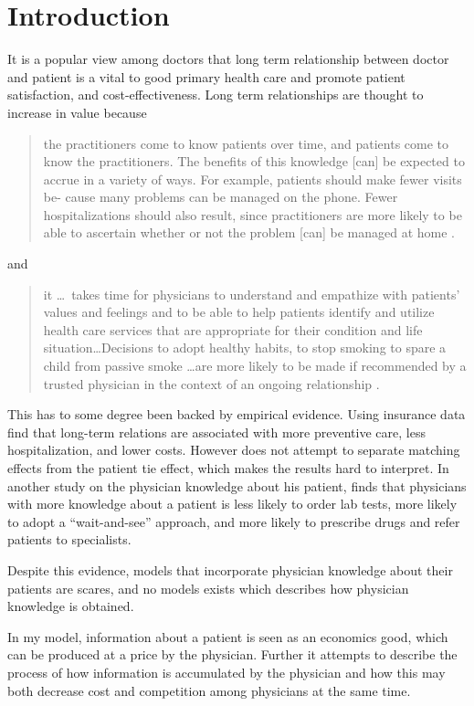 \documentclass[11pt,a4paper,twoside]{article}
\begin{document}
\section{Introduction}
It is a popular view among doctors that long term relationship between doctor and patient is a vital to good primary health care and promote patient satisfaction, and cost-effectiveness. Long term relationships are thought to increase in value because
\begin{quotation}
the practitioners come to know patients over time, and patients come to know the practitioners. The benefits of this knowledge [can] be expected to accrue in a variety of ways. For example, patients should make fewer visits be- cause many problems can be managed on the phone. Fewer hospitalizations should also result, since practitioners are more likely to be able to ascertain whether or not the problem [can] be managed at home \parencite[p. 41--42]{Starfield1992}.
\end{quotation}
and
\begin{quotation}
it \ldots \ takes time for physicians to understand and empathize with patients' values and feelings and to be able to help patients identify and utilize health care services that are appropriate for their condition and life situation\ldots Decisions to adopt healthy habits, to stop smoking to spare a child from passive smoke \ldots are more likely to be made if recommended by a trusted physician in the context of an ongoing relationship \parencite[p. 324--235]{Emanuel1995}.
\end{quotation}
This has to some degree been backed by empirical evidence. Using insurance data \textcite{Weiss1996} find that long-term relations are associated with more preventive care, less hospitalization, and lower costs. However \citeauthor{Weiss1996} does not attempt to separate matching effects from the patient tie effect, which makes the results hard to interpret. In another study on the physician knowledge about his patient,   \textcite{Hjortdahl1991}  finds that physicians with more knowledge about a patient is less likely to order lab tests, more likely to adopt a ``wait-and-see'' approach, and more likely to prescribe drugs and refer patients to specialists.

Despite this evidence, models that incorporate physician knowledge about their patients are scares, and no models exists which describes how physician knowledge is obtained.

In my model, information about a patient is seen as an economics good, which can be produced at a price by the physician. Further it attempts to describe the process of how information is accumulated by the physician and how this may both decrease cost and competition among physicians at the same time.
\end{document}
